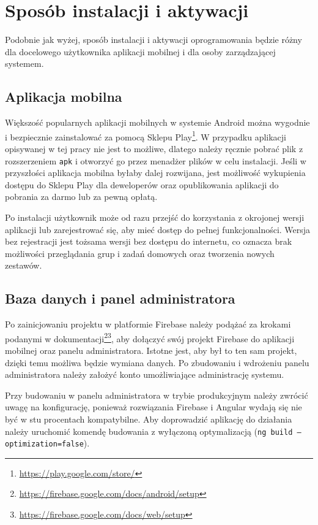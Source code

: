 \documentclass[a4paper,twoside,12pt]{book}
\begin{document}
\section{Sposób instalacji i aktywacji}

Podobnie jak wyżej, sposób instalacji i aktywacji oprogramowania będzie różny dla docelowego użytkownika aplikacji mobilnej i dla osoby zarządzającej systemem. 

\subsection{Aplikacja mobilna}
Większość popularnych aplikacji mobilnych w systemie Android można wygodnie i bezpiecznie zainstalować za pomocą Sklepu Play\footnote{\url{https://play.google.com/store/}}. W przypadku aplikacji opisywanej w tej pracy nie jest to możliwe, dlatego należy ręcznie pobrać plik z rozszerzeniem \texttt{apk} i otworzyć go przez menadżer plików w celu instalacji. Jeśli w przyszłości aplikacja mobilna byłaby dalej rozwijana, jest możliwość wykupienia dostępu do Sklepu Play dla deweloperów oraz opublikowania aplikacji do pobrania za darmo lub za pewną opłatą. 

Po instalacji użytkownik może od razu przejść do korzystania z okrojonej wersji aplikacji lub zarejestrować się, aby mieć dostęp do pełnej funkcjonalności. Wersja bez rejestracji jest tożsama wersji bez dostępu do internetu, co oznacza brak możliwości przeglądania grup i zadań domowych oraz tworzenia nowych zestawów.

\subsection{Baza danych i panel administratora}

Po zainicjowaniu projektu w platformie Firebase należy podążać za krokami podanymi w dokumentacji\footnote{\url{https://firebase.google.com/docs/android/setup}}\footnote{\url{https://firebase.google.com/docs/web/setup}}, aby dołączyć swój projekt Firebase do aplikacji mobilnej oraz panelu administratora. Istotne jest, aby był to ten sam projekt, dzięki temu możliwa będzie wymiana danych. Po zbudowaniu i wdrożeniu panelu administratora należy założyć konto umożliwiające administrację systemu. 

Przy budowaniu w panelu administratora w trybie produkcyjnym należy zwrócić uwagę na konfigurację, ponieważ rozwiązania Firebase i Angular wydają się nie być w stu procentach kompatybilne. Aby doprowadzić aplikację do działania należy uruchomić komendę budowania z wyłączoną optymalizacją (\texttt{ng build --optimization=false}).
\end{document}
